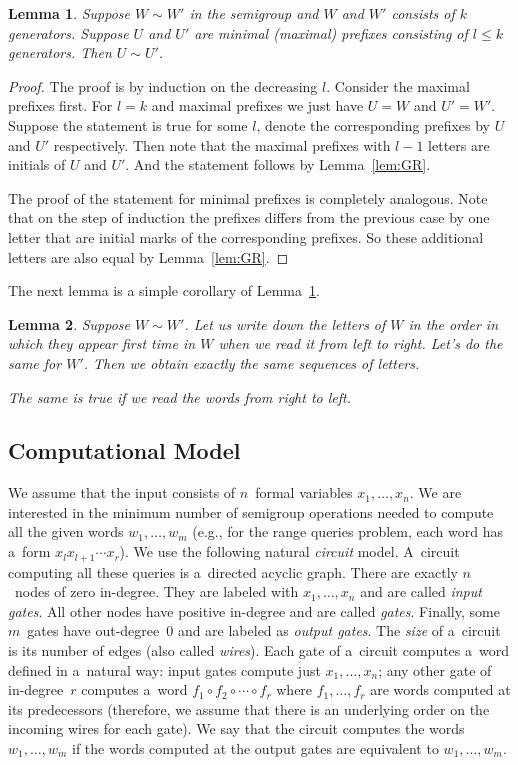 \documentclass[11pt,letterpaper]{article}
\newtheorem{lemma}{Lemma}
\begin{document}
\begin{lemma} \label{lem:prefix_equivalence}
Suppose $W\sim W'$ in the semigroup and $W$ and $W'$ consists of $k$ generators. Suppose $U$ and $U'$ are minimal (maximal) prefixes consisting of $l\leq k$ generators. Then $U\sim U'$.
\end{lemma}

\begin{proof}
The proof is by induction on the decreasing $l$. Consider the maximal prefixes first. For $l=k$ and maximal prefixes we just have $U= W$ and $U'=W'$. Suppose the statement is true for some $l$, denote the corresponding prefixes by $U$ and $U'$ respectively. Then note that the maximal prefixes with $l-1$ letters are initials of $U$ and $U'$. And the statement follows by Lemma~\ref{lem:GR}.

The proof of the statement for minimal prefixes is completely analogous. Note that on the step of induction the prefixes differs from the previous case by one letter that are  initial marks of the corresponding prefixes. So these additional letters are also equal by Lemma~\ref{lem:GR}.
\end{proof}

The next lemma is a simple corollary of Lemma~\ref{lem:prefix_equivalence}.
\begin{lemma} \label{lem:variables_order}
Suppose $W \sim W'$. Let us write down the letters of $W$ in the order in which they appear first time in $W$ when we read it from left to right. Let's do the same for $W'$. Then we obtain exactly the same sequences of letters.

The same is true if we read the words from right to left.
\end{lemma}


\subsection{Computational Model}
We assume that the input consists of $n$~formal variables $x_1, \dotsc, x_n$. We are interested in the minimum number of semigroup operations needed to compute all the given words $w_1, \dotsc, w_m$ (e.g., for the range queries problem, each word has a~form $x_lx_{l+1}\dotsb x_r$). We use the following natural {\em circuit} model. A~circuit computing all these queries is a~directed acyclic graph. There are exactly $n$~nodes of zero in-degree. They are labeled with $x_1, \dotsc, x_n$ and are called {\em input gates}. All other nodes have positive in-degree and are called {\em gates}. Finally, some $m$~gates have out-degree~0 and are labeled as {\em output gates}. The {\em size} of a~circuit is its number of edges (also called {\em wires}). Each gate of a~circuit computes a~word defined in a~natural way: input gates compute just $x_1, \dotsc, x_n$; any other gate of in-degree~$r$ computes a~word $f_1 \circ f_2 \circ \dotsb \circ f_r$ where $f_1, \dotsc, f_r$ are words computed at its predecessors (therefore, we assume that there is an underlying order on the incoming wires for each gate). We say that the circuit computes the words $w_1, \dotsc, w_m$ if the words computed at the output gates are equivalent to $w_1, \dotsc, w_m$.
\end{document}
